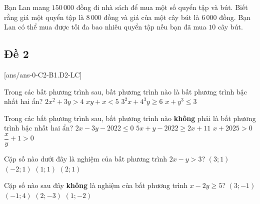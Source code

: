  \begin{ex}%
 	Bạn Lan mang $150\,000$ đồng đi nhà sách để mua một số quyển tập và bút. Biết rằng giá một quyển tập là $8\,000$ đồng và giá của một cây bút là $6\,000$ đồng. Bạn Lan có thể mua được tối đa bao nhiêu quyển tập nếu bạn đã mua $10$ cây bút.
 \end{ex}
 \newpage 
\subsection{Đề 2}
[ans/ans-0-C2-B1.D2-LC]
\caulc
\begin{ex}%
	Trong các bất phương trình sau, bất phương trình nào là bất phương trình bậc nhất hai ẩn?
	\choice
	{$2x^2+3y>4$}
	{$xy+x<5$}
	{\True $3^2x+4^3y\ge 6$}
	{$x+y^3\le 3$}
\end{ex}

\begin{ex}%
	Trong các bất phương trình sau, bất phương trình nào \textbf{không} phải là bất phương trình bậc nhất hai ẩn?
	\choice
	{$2x-3y-2022\le 0$}
	{$5x+y-2022\ge 2x+11$}
	{$x+2025>0$}
	{\True $\dfrac{x}{y}+1>0$}
\end{ex}

\begin{ex}%
	Cặp số nào dưới đây là nghiệm của bất phương trình $2x-y>3$?
	\choice
	{\True $(3;1)$}
	{$(-2;1)$}
	{$(1;1)$}
	{$(2;1)$}
\end{ex}

\begin{ex}%
	Cặp số nào sau đây \textbf{không} là nghiệm của bất phương trình $x-2y\ge 5$?
	\choice
	{$(3;-1)$}
	{\True $(-1;4)$}
	{$(2;-3)$}
	{$(1;-2)$}
\end{ex}

